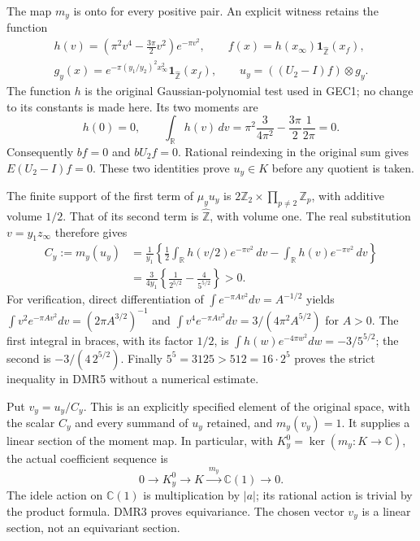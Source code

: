 The map $m_y$ is onto for every positive pair. An explicit witness
retains the function
\begin{equation}\tag{DMR4}
\begin{gathered}
h(v)=\left(\pi^2v^4-\frac{3\pi}{2}v^2\right)e^{-\pi v^2},
\qquad
f(x)=h(x_\infty)\mathbf1_{\widehat{\mathbb Z}}(x_f),\\
g_y(x)=e^{-\pi(y_1/y_2)^2x_\infty^2}
                 \mathbf1_{\widehat{\mathbb Z}}(x_f),
\qquad
u_y=((U_2-I)f)\otimes g_y.
\end{gathered}
\end{equation}
The function $h$ is the original Gaussian-polynomial test used in
GEC1; no change to its constants is made here. Its two moments
are
\[
h(0)=0,\qquad
\int_{\mathbb R}h(v)\,dv
=\pi^2\frac3{4\pi^2}
 -\frac{3\pi}{2}\frac1{2\pi}=0.
\]
Consequently $bf=0$ and $bU_2f=0$. Rational reindexing in the
original sum gives $E(U_2-I)f=0$. These two identities prove
$u_y\in K$ before any quotient is taken.

The finite support of the first term of $\mu_yu_y$ is
$2\mathbb Z_2\times\prod_{p\ne2}\mathbb Z_p$, with additive
volume $1/2$. That of its second term is $\widehat{\mathbb Z}$,
with volume one. The real substitution $v=y_1z_\infty$ therefore
gives
\begin{equation}\tag{DMR5}
\begin{split}
C_y:=m_y(u_y)
 &=\frac1{y_1}\left\{
 \frac12\int_{\mathbb R}h(v/2)e^{-\pi v^2}\,dv
       -\int_{\mathbb R}h(v)e^{-\pi v^2}\,dv\right\}\\
 &=\frac3{4y_1}\left\{\frac1{2^{5/2}}
                            -\frac4{5^{5/2}}\right\}>0.
\end{split}
\end{equation}
For verification, direct differentiation of
$\int e^{-\pi Av^2}dv=A^{-1/2}$ yields
$\int v^2e^{-\pi Av^2}dv=(2\pi A^{3/2})^{-1}$ and
$\int v^4e^{-\pi Av^2}dv=3/(4\pi^2A^{5/2})$ for $A>0$.
The first integral in braces, with its factor $1/2$, is
$\int h(w)e^{-4\pi w^2}dw=-3/5^{5/2}$;
the second is $-3/(4\,2^{5/2})$.
Finally $5^5=3125>512=16\cdot2^5$ proves the strict inequality
in DMR5 without a numerical estimate.

Put $v_y=u_y/C_y$. This is an explicitly specified element of
the original space, with the scalar $C_y$ and every summand of
$u_y$ retained, and $m_y(v_y)=1$. It supplies a linear section
of the moment map. In particular, with
$K_y^0=\ker(m_y:K\to\mathbb C)$, the actual coefficient sequence is
\begin{equation}\tag{DMR6}
0\longrightarrow K_y^0\longrightarrow K
   \xrightarrow{\ m_y\ }\mathbb C(1)\longrightarrow0.
\end{equation}
The idele action on $\mathbb C(1)$ is multiplication by $|a|$;
its rational action is trivial by the product formula. DMR3
proves equivariance. The chosen vector $v_y$ is a linear
section, not an equivariant section.

